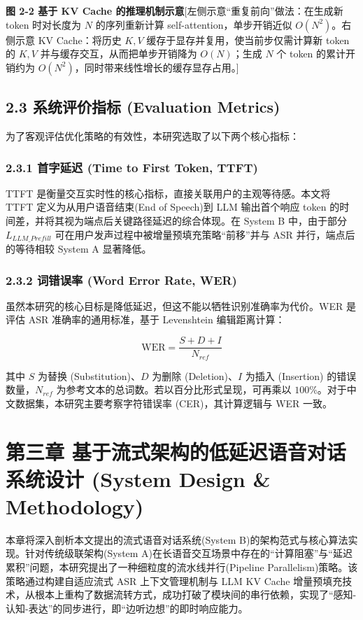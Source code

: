 \documentclass[UTF8,a4paper,12pt]{ctexart}
\begin{document}
\textbf{图 2-2 基于 KV Cache 的推理机制示意}[左侧示意“重复前向”做法：在生成新 token 时对长度为 $N$ 的序列重新计算 self-attention，单步开销近似 $O(N^2)$。右侧示意 KV Cache：将历史 $K,V$ 缓存于显存并复用，使当前步仅需计算新 token 的 $K,V$ 并与缓存交互，从而把单步开销降为 $O(N)$；生成 $N$ 个 token 的累计开销约为 $O(N^2)$，同时带来线性增长的缓存显存占用。]

\subsection*{2.3 系统评价指标 (Evaluation Metrics)}


为了客观评估优化策略的有效性，本研究选取了以下两个核心指标：

\subsubsection*{2.3.1 首字延迟 (Time to First Token, TTFT)}


TTFT 是衡量交互实时性的核心指标，直接关联用户的主观等待感。本文将 TTFT 定义为从用户语音结束(End of Speech)到 LLM 输出首个响应 token 的时间差，并将其视为端点后关键路径延迟的综合体现。在 System B 中，由于部分 $L_{LLM\_Prefill}$ 可在用户发声过程中被增量预填充策略“前移”并与 ASR 并行，端点后的等待相较 System A 显著降低。

\subsubsection*{2.3.2 词错误率 (Word Error Rate, WER)}


虽然本研究的核心目标是降低延迟，但这不能以牺牲识别准确率为代价。WER 是评估 ASR 准确率的通用标准，基于 Levenshtein 编辑距离计算：  

\[
\text{WER} = \frac{S + D + I}{N_{ref}}
\]


其中 $S$ 为替换 (Substitution)、$D$ 为删除 (Deletion)、$I$ 为插入 (Insertion) 的错误数量，$N_{ref}$ 为参考文本的总词数。若以百分比形式呈现，可再乘以 $100\%$。对于中文数据集，本研究主要考察字符错误率 (CER)，其计算逻辑与 WER 一致。

\section*{第三章 基于流式架构的低延迟语音对话系统设计 (System Design \& Methodology)}


本章将深入剖析本文提出的流式语音对话系统(System B)的架构范式与核心算法实现。针对传统级联架构(System A)在长语音交互场景中存在的“计算阻塞”与“延迟累积”问题，本研究提出了一种细粒度的流水线并行(Pipeline Parallelism)策略。该策略通过构建自适应流式 ASR 上下文管理机制与 LLM KV Cache 增量预填充技术，从根本上重构了数据流转方式，成功打破了模块间的串行依赖，实现了“感知-认知-表达”的同步进行，即“边听边想”的即时响应能力。
\end{document}
